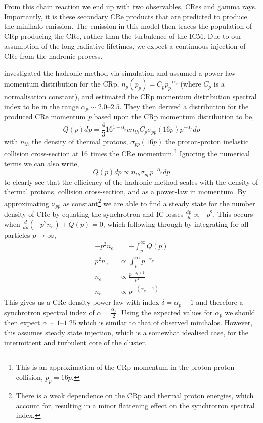 From this chain reaction we end up with two observables, CRes and gamma rays. Importantly, it is these secondary CRe products that are predicted to produce the minihalo emission. The emission in this model then traces the population of CRp producing the CRe, rather than the turbulence of the ICM. Due to our assumption of the long radiative lifetimes, we expect a continuous injection of CRe from the hadronic process. 

\citet{ZuHone2015} investigated the hadronic method via simulation and assumed a power-law momentum distribution for the CRp, $n_p(p_p) = C_pp_p^{-\alpha_p}$ (where $C_p$ is a normalisation constant), and estimated the CRp momentum distribution spectral index to be in the range $\alpha_p \sim 2.0$--$2.5$. They then derived a distribution for the produced CRe momentum $p$ based upon the CRp momentum distribution to be,
\begin{equation}
    Q(p)dp = \frac4316^{1-\alpha_p} c n_{th} C_p \sigma_{pp} (16p) p^{-\alpha_p} dp
\end{equation}
with $n_{th}$ the density of thermal protons, $\sigma_{pp}(16p)$ the proton-proton inelastic collision cross-section at 16 times the CRe momentum.\footnote{This is an approximation of the CRp momentum in the proton-proton collision, $p_p = 16p$.} Ignoring the numerical terms we can also write,
\begin{equation}
     Q(p)dp \propto n_{th} \sigma_{pp} p^{-\alpha_p}dp
\end{equation}
to clearly see that the efficiency of the hadronic method scales with the density of thermal protons, collision cross-section, and as a power-law in momentum. By approximating $\sigma_{pp}$ as constant\footnote{There is a weak dependence on the CRp and thermal proton energies, which \citet{ZuHone2015} account for, resulting in a minor flattening effect on the synchrotron spectral index.} we are able to find a steady state for the number density of CRe by equating the synchrotron and IC losses $\frac{dp}{dt} \propto -p^2$. This occurs when $\frac{d}{dp}(-p^2n_e) + Q(p) = 0$, which following through by integrating for all particles $p \rightarrow \infty$,
\begin{align*}
    -p^2n_e &= -\int_p^\infty Q(p)\\
    p^2n_e &\propto \int_p^\infty p^{-\alpha_p}\\
    n_e &\propto \frac{p^{-\alpha_p+1}}{p^2}\\
    n_e &\propto p^{-(\alpha_p + 1)}
\end{align*}
This gives us a CRe density power-law with index $\delta = \alpha_p + 1$ and therefore a synchrotron spectral index of $\alpha = \frac{\alpha_p}2$. Using the expected values for $\alpha_p$ we should then expect $\alpha \sim 1$--$1.25$ which is similar to that of observed minihalos. However, this assumes steady state injection, which is a somewhat idealised case, for the intermittent and turbulent core of the cluster.

